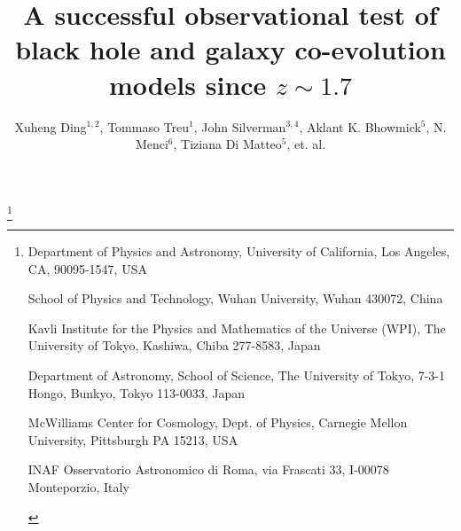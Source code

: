 \documentclass{natureprintstyle}
\title{
A successful observational test of black hole and galaxy co-evolution models since $z\sim1.7$
}
\author{Xuheng Ding$^{1,2}$, 
Tommaso Treu$^{1}$, 
John Silverman$^{3, 4}$,
Aklant K. Bhowmick$^{5}$,
N. Menci$^{6}$,
Tiziana Di Matteo$^{5}$,
et. al.
}
\begin{document}
\maketitle

\let\thefootnote\relax\footnote{
\begin{affiliations}
\item {Department of Physics and Astronomy, University of California, Los Angeles, CA, 90095-1547, USA} 
\item {School of Physics and Technology, Wuhan University, Wuhan 430072, China}
\item {Kavli Institute for the Physics and Mathematics of the Universe (WPI), The University of Tokyo, Kashiwa, Chiba 277-8583, Japan}
\item {Department of Astronomy, School of Science, The University of Tokyo, 7-3-1 Hongo, Bunkyo, Tokyo 113-0033, Japan}
\item{McWilliams Center for Cosmology, Dept. of Physics, Carnegie Mellon University, Pittsburgh PA 15213, USA}
\item{INAF Osservatorio Astronomico di Roma, via Frascati 33, I-00078 Monteporzio, Italy}
\end{affiliations}
}
\end{document}
